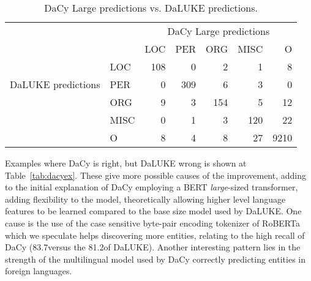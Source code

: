 \documentclass[main.tex]{subfiles}
\begin{document}
\begin{table}[H]
    \centering
    \begin{tabular}{l l | r r r r r }
        & &	\multicolumn{5}{c}{DaCy Large predictions}	\\
        \multirow{5}{*}{DaLUKE predictions} & & LOC & PER & ORG & MISC & O \\\hline
           & LOC                             &  108 & 0   & 2   & 1    & 8\\
           & PER                             &  0   & 309 & 6   & 3    & 0\\
           & ORG                             &  9   & 3   & 154 & 5    & 12\\
           & MISC                            &  0   & 1   & 3   & 120  & 22\\
           & O                               &  8   & 4   & 8   & 27   & 9210
    \end{tabular}
    \label{tab:dacycompare}
    \caption{
        DaCy Large predictions vs. DaLUKE predictions.
    }
\end{table}\noindent
Examples where DaCy is right, but DaLUKE wrong is shown at Table~\ref{tab:dacyex}.
These give more possible causes of the improvement, adding to the initial explanation of DaCy employing a BERT \emph{large}-sized transformer, adding flexibility to the model, theoretically allowing higher level language features to be learned compared to the base size model used by DaLUKE.
One cause is the use of the case sensitive byte-pair encoding tokenizer of RoBERTa \cite{conneau2020unsupervised} which we speculate helps discovering more entities, relating to the high recall of DaCy (83.7\pro versus the 81.2\pro of DaLUKE).
Another interesting pattern lies in the strength of the multilingual model used by DaCy correctly predicting entities in foreign languages.
\end{document}
